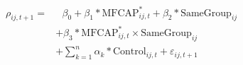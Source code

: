 \begin{equation}
\begin{split}
\rho_{ij,t+1} = & \text{ 	}\beta_0 + \beta_1* \text{MFCAP}^*_{ij,t} + \beta_2* \text{SameGroup}_{ij} \\
 &	+\beta_3* \text{MFCAP}^*_{ij,t} \times \text{SameGroup}_{ij}   \\
  & + \sum_{k=1} ^{n} \alpha_k*\text{Control}_{ij,t} + \varepsilon_{ij,t+1}
\end{split}
\label{model1}
\end{equation}